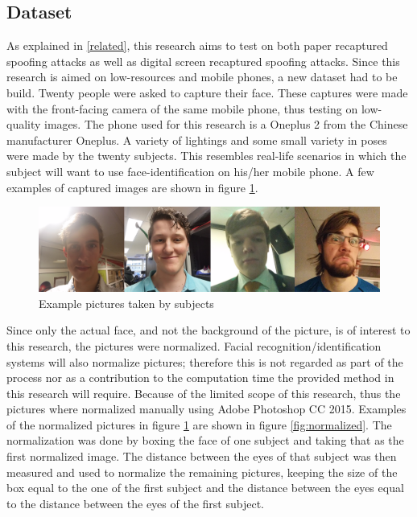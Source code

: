 \documentclass{sig-alternate-br}
\begin{document}
\subsection{Dataset} \label{dataset}
As explained in \ref{related}, this research aims to test on both paper recaptured spoofing attacks as well as digital screen recaptured spoofing attacks. Since this research is aimed on low-resources and mobile phones, a new dataset had to be build. Twenty people were asked to capture their face. These captures were made with the front-facing camera of the same mobile phone, thus testing on low-quality images. The phone used for this research is a Oneplus 2 from the Chinese manufacturer Oneplus. A variety of lightings and some small variety in poses were made by the twenty subjects. This resembles real-life scenarios in which the subject will want to use face-identification on his/her mobile phone. A few examples of captured images are shown in figure \ref{fig:pictures}.

\begin{figure}[h]
	\includegraphics[scale=0.2]{pictures}
	\caption{Example pictures taken by subjects}
	\label{fig:pictures}
\end{figure}

Since only the actual face, and not the background of the picture, is of interest to this research, the pictures were normalized. Facial recognition/identification systems will also normalize pictures; therefore this is not regarded as part of the process nor as a contribution to the computation time the provided method in this research will require. Because of the limited scope of this research, thus the pictures where normalized manually using Adobe Photoshop CC 2015. Examples of the normalized pictures in figure \ref{fig:pictures} are shown in figure \ref{fig:normalized}. The normalization was done by boxing the face of one subject and taking that as the first normalized image. The distance between the eyes of that subject was then measured and used to normalize the remaining pictures, keeping the size of the box equal to the one of the first subject and the distance between the eyes equal to the distance between the eyes of the first subject.
\end{document}
